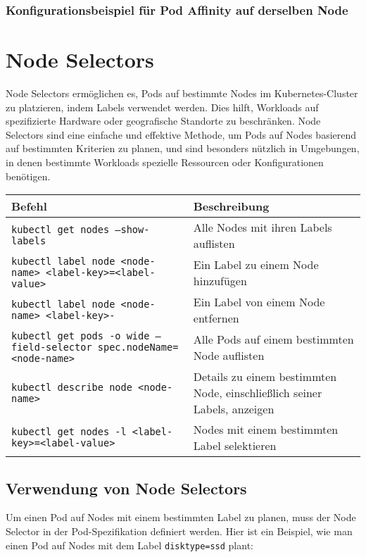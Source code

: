 \subsubsection{Konfigurationsbeispiel für Pod Affinity auf derselben Node}


\newpage
\section{Node Selectors}
Node Selectors ermöglichen es, Pods auf bestimmte Nodes im Kubernetes-Cluster zu platzieren, indem Labels verwendet werden. Dies hilft, Workloads auf spezifizierte Hardware oder geografische Standorte zu beschränken. Node Selectors sind eine einfache und effektive Methode, um Pods auf Nodes basierend auf bestimmten Kriterien zu planen, und sind besonders nützlich in Umgebungen, in denen bestimmte Workloads spezielle Ressourcen oder Konfigurationen benötigen.\\

\noindent
\begin{tabular}{
|p{}|p{}|}
\hline
\textbf{Befehl} & \textbf{Beschreibung} \\
\hline
\texttt{kubectl get nodes --show-labels} & Alle Nodes mit ihren Labels auflisten \\
\texttt{kubectl label node <node-name> <label-key>=<label-value>} & Ein Label zu einem Node hinzufügen \\
\texttt{kubectl label node <node-name> <label-key>-} & Ein Label von einem Node entfernen \\
\texttt{kubectl get pods -o wide --field-selector spec.nodeName=<node-name>} & Alle Pods auf einem bestimmten Node auflisten \\
\texttt{kubectl describe node <node-name>} & Details zu einem bestimmten Node, einschließlich seiner Labels, anzeigen \\
\texttt{kubectl get nodes -l <label-key>=<label-value>} & Nodes mit einem bestimmten Label selektieren \\
\hline
\end{tabular}

\subsection{Verwendung von Node Selectors}
Um einen Pod auf Nodes mit einem bestimmten Label zu planen, muss der Node Selector in der Pod-Spezifikation definiert werden. Hier ist ein Beispiel, wie man einen Pod auf Nodes mit dem Label \texttt{disktype=ssd} plant:



